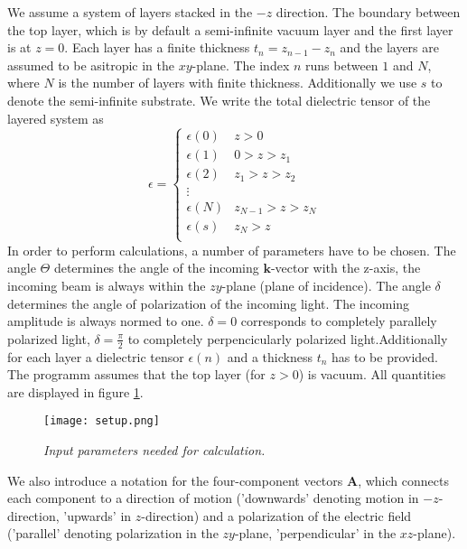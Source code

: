 \documentclass[11pt]{article}
\begin{document}
We assume a system of layers stacked in the $-z$ direction. The boundary between the top layer, which is by default a semi-infinite vacuum layer and the first layer is at $z=0$. Each layer has a finite thickness $t_{n}=z_{n-1}-z_{n}$ and the layers are assumed to be asitropic in the $xy$-plane. The index $n$ runs between $1$ and $N$, where $N$ is the number of layers with finite thickness. Additionally we use $s$ to denote the semi-infinite substrate.
We write the total dielectric tensor of the layered system as
\begin{equation}
 \epsilon= \begin{cases}
 								\epsilon(0) &  z>0 \\
 								\epsilon(1) & 0>z>z_1 \\
 								\epsilon(2) & z_1>z>z_2 \\
 								\vdots \\
 								\epsilon(N) & z_{N-1}>z>z_N \\
 								\epsilon(s) & z_N>z \\
 								
 \end{cases}
\end{equation}
In order to perform calculations, a number of parameters have to be chosen. The angle $\Theta$ determines the angle of the incoming $\mathbf{k}$-vector with the z-axis, the incoming beam is always within the $zy$-plane (plane of incidence). The angle $\delta$ determines the angle of polarization of the incoming light. The incoming amplitude is always normed to one. $\delta=0$ corresponds to completely parallely polarized light, $\delta=\frac{\pi}{2}$ to completely perpencicularly polarized light.Additionally for each layer a dielectric tensor $\epsilon(n)$ and a thickness $t_{n}$ has to be provided. The programm assumes that the top layer (for $z>0$) is vacuum. All quantities are displayed in figure \ref{abb1}. 
\begin{figure}[H]
\begin{center}
\texttt{[image: setup.png]}
\end{center}
\caption[Experimental Setup]{\textit{Input parameters needed for calculation.}}
\label{abb1}
\end{figure}
We also introduce a notation for the four-component vectors $\mathbf{A}$, which connects each component to a direction of motion ('downwards' denoting motion in $-z$-direction, 'upwards' in $z$-direction) and a polarization of the electric field ('parallel' denoting polarization in the  $zy$-plane, 'perpendicular' in the  $xz$-plane).
\end{document}
